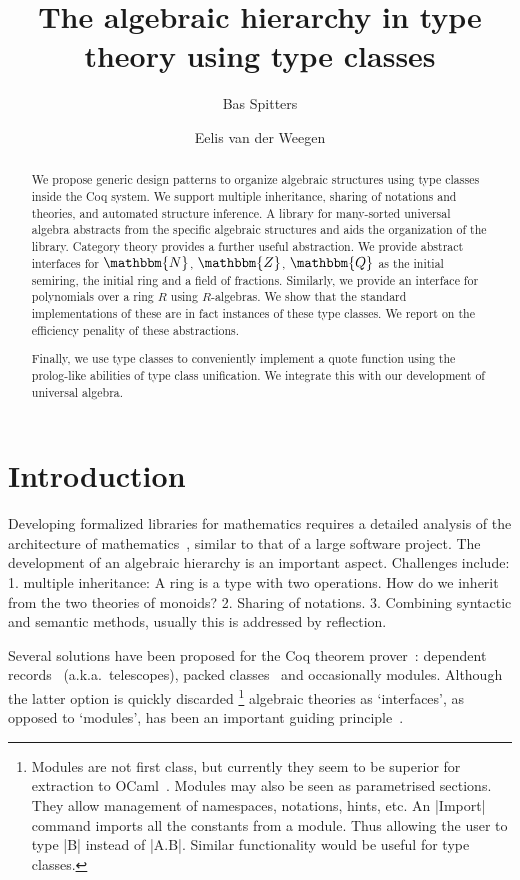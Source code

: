 \documentclass[a4paper,10pt, runningheads]{llncs}
\newcommand{\N}{\ensuremath{\mathbbm{N}}}
\newcommand{\Z}{\ensuremath{\mathbbm{Z}}}
\newcommand{\Q}{\ensuremath{\mathbbm{Q}}}
\begin{document}
\title{The algebraic hierarchy in type theory using type classes}
\author{Bas Spitters \and Eelis van der Weegen}
\maketitle
\begin{abstract}
We propose generic design patterns to organize algebraic structures using type classes inside the
Coq system. We support multiple inheritance, sharing of notations and theories, and automated
structure inference. A library for many-sorted universal algebra abstracts from the specific
algebraic structures and aids the organization of the library. Category theory provides a further
useful abstraction. We provide abstract
interfaces for $\N$, $\Z$, $\Q$ as the initial semiring, the initial ring and a field of
fractions. Similarly, we provide an interface for polynomials over a ring $R$ using $R$-algebras.
We show that the standard implementations of these are in fact instances of these type classes.
We report on the efficiency penality of these abstractions.

Finally, we use type classes to conveniently implement a quote function using the prolog-like
abilities of type class unification. We integrate this with our development of universal algebra.
\end{abstract}

\section{Introduction}
Developing formalized libraries for mathematics requires a detailed analysis of the
architecture of mathematics~\cite{C-corn,DBLP:conf/types/HaftmannW08}, similar to that of a large
software project.
The development of an algebraic hierarchy is an important aspect. Challenges include: 1. multiple
inheritance: A ring is a type with two operations. How do we inherit from the two theories of
monoids? 2. Sharing of notations. 3. Combining syntactic and semantic methods, usually this is
addressed by reflection.

Several solutions have been proposed for the Coq theorem prover~\cite{Coq,BC04}: dependent
records~\cite{DBLP:journals/jsc/GeuversPWZ02} (a.k.a.\ telescopes), packed classes~\cite{Packed} and
occasionally modules. Although the latter option is quickly discarded%
\footnote{Modules are not first class, but currently they seem to be superior for extraction to
OCaml~\cite{letouzey02}. Modules may also be seen as parametrised sections. They allow management
of namespaces, notations, hints, etc. An |Import| command imports all the constants from a
module. Thus allowing the user to type |B| instead of |A.B|. Similar functionality would be useful
for type classes.}
algebraic theories as `interfaces', as opposed to `modules', has been an important
guiding principle~\cite{Packed}.
\end{document}
